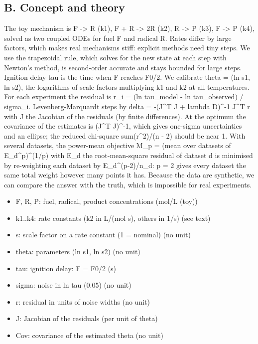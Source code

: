 \documentclass[11pt,a4paper]{article}
\begin{document}
\subsection*{B. Concept and theory}
The toy mechanism is F -\textgreater{} R (k1), F + R -\textgreater{} 2R (k2), R -\textgreater{} P (k3), F -\textgreater{} P (k4), solved as two coupled ODEs for fuel F and radical R. Rates differ by large factors, which makes real mechanisms stiff: explicit methods need tiny steps. We use the trapezoidal rule, which solves for the new state at each step with Newton's method, is second-order accurate and stays bounded for large steps. Ignition delay tau is the time when F reaches F0/2. We calibrate theta = (ln s1, ln s2), the logarithms of scale factors multiplying k1 and k2 at all temperatures. For each experiment the residual is r\_i = (ln tau\_model - ln tau\_observed) / sigma\_i. Levenberg-Marquardt steps by delta = -(J\textasciicircum{}T J + lambda D)\textasciicircum{}-1 J\textasciicircum{}T r with J the Jacobian of the residuals (by finite differences). At the optimum the covariance of the estimates is (J\textasciicircum{}T J)\textasciicircum{}-1, which gives one-sigma uncertainties and an ellipse; the reduced chi-square sum(r\textasciicircum{}2)/(n - 2) should be near 1. With several datasets, the power-mean objective M\_p = (mean over datasets of E\_d\textasciicircum{}p)\textasciicircum{}(1/p) with E\_d the root-mean-square residual of dataset d is minimised by re-weighting each dataset by E\_d\textasciicircum{}(p-2)/n\_d: p = 2 gives every dataset the same total weight however many points it has. Because the data are synthetic, we can compare the answer with the truth, which is impossible for real experiments.

\begin{itemize}[nosep]
\item F, R, P: fuel, radical, product concentrations (mol/L (toy))
\item k1..k4: rate constants (k2 in L/(mol s), others in 1/s) (see text)
\item s: scale factor on a rate constant (1 = nominal) (no unit)
\item theta: parameters (ln s1, ln s2) (no unit)
\item tau: ignition delay: F = F0/2 (s)
\item sigma: noise in ln tau (0.05) (no unit)
\item r: residual in units of noise widths (no unit)
\item J: Jacobian of the residuals (per unit of theta)
\item Cov: covariance of the estimated theta (no unit)
\end{itemize}
\end{document}
